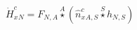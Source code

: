 \documentclass[border=2pt]{standalone}
\begin{document}
${{\dot{H}^c_x}}{_{N}}={{F}}{_{N, A}} \stackrel{A}{\star} \left({{\hat{n}^c_x}}{_{A, S}} \stackrel{S}{\star} {h}{_{N, S}}\right)$
\end{document}
